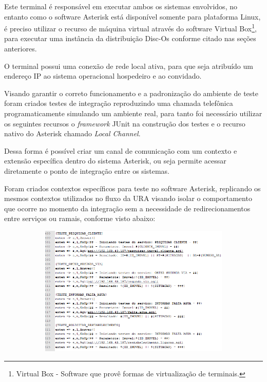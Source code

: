 Este terminal é responsável em executar ambos os sistemas envolvidos, no entanto como o software Asterisk está disponível somente para plataforma Linux, é preciso utilizar o recurso de máquina virtual através do software Virtual Box\footnote{Virtual Box - Software que provê formas de virtualização de terminais.}, para executar uma instância da distribuição Disc-Os conforme citado nas seções anteriores.
 
O terminal possui uma conexão de rede local ativa, para que seja atribuído um endereço IP ao sistema operacional hospedeiro e ao convidado.

Visando garantir o correto funcionamento e a padronização do ambiente de teste foram criados testes de integração reproduzindo uma chamada telefônica programaticamente simulando um ambiente real, para tanto foi necessário utilizar os seguintes recursos o \textit{framework} JUnit na construção dos testes e o recurso nativo do Asterisk chamado \textit{Local Channel}.

Dessa forma é possível criar um canal de comunicação com um contexto e extensão específica dentro do sistema Asterisk, ou seja permite acessar diretamente o ponto de integração entre os sistemas.

Foram criados contextos específicos para teste no software Asterisk, replicando os mesmos contextos utilizados no fluxo da URA visando 
isolar o comportamento que ocorre no momento da integração sem a necessidade de redirecionamentos entre serviços ou ramais, conforme visto abaixo:

\begin{figure}[H]
	\centering
	\caption{\textbf{Declaração dos contextos de teste no Asterisk}}
	\label{figura:contextoTeste}
	\begin{subfigure}[H]{\textwidth}
		\centering
		\includegraphics{figuras/contexto_teste.png}
	\end{subfigure}
\end{figure}
	

